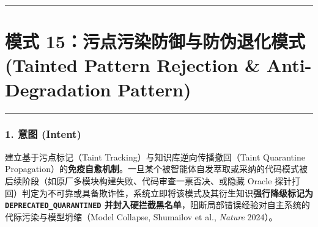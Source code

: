 \begin{Shaded}
\begin{Highlighting}[]
  \OperatorTok{:} \OperatorTok{,}\OperatorTok{:} \NormalTok{)}\OperatorTok{:} \NormalTok{ \{}
    \OperatorTok{:}\OperatorTok{=}  \OperatorTok{:} \OperatorTok{;}
      \KeywordTok{=\textgreater{}} \OperatorTok{===}\OperatorTok{\&\&} \OperatorTok{===} \NormalTok{)}
      \KeywordTok{=\textgreater{}}\NormalTok{ \{}
 \OperatorTok{=}\OperatorTok{;}
\NormalTok{      \})}\OperatorTok{;}
\NormalTok{  \}}
\NormalTok{\}}
\end{Highlighting}
\end{Shaded}

\begin{center}\rule{0.5\linewidth}{0.5pt}\end{center}

\section{模式 15：污点污染防御与防伪退化模式 (Tainted Pattern Rejection
\& Anti-Degradation
Pattern)}\label{ux6a21ux5f0f-15ux6c61ux70b9ux6c61ux67d3ux9632ux5fa1ux4e0eux9632ux4f2aux9000ux5316ux6a21ux5f0f-tainted-pattern-rejection-anti-degradation-pattern}

\begin{center}\rule{0.5\linewidth}{0.5pt}\end{center}

\subsubsection{1. 意图 (Intent)}\label{ux610fux56fe-intent-14}

建立基于污点标记（Taint Tracking）与知识库逆向传播撤回（Taint Quarantine
Propagation）的\textbf{免疫自愈机制}。一旦某个被智能体自发萃取或采纳的代码模式被后续阶段（如原厂多模块构建失败、代码审查一票否决、或隐藏
Oracle
探针打回）判定为不可靠或具备欺诈性，系统立即将该模式及其衍生知识\textbf{强行降级标记为
\texttt{DEPRECATED\_QUARANTINED}
并封入硬拦截黑名单}，阻断局部错误经验对自主系统的代际污染与模型坍缩（Model
Collapse, Shumailov et al., \emph{Nature} 2024）。

